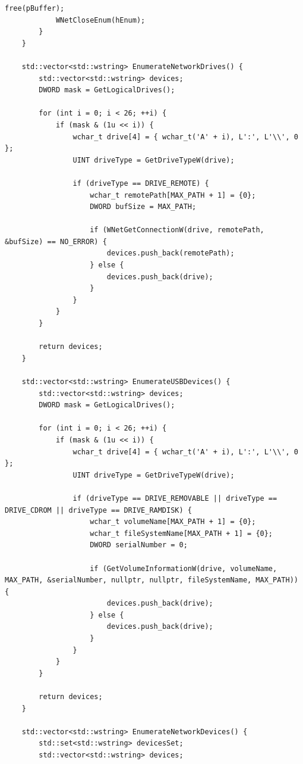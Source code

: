 \begin{lstlisting}[style=CodeListing]
            free(pBuffer);
            WNetCloseEnum(hEnum);
        }
    }
    
    std::vector<std::wstring> EnumerateNetworkDrives() {
        std::vector<std::wstring> devices;
        DWORD mask = GetLogicalDrives();
        
        for (int i = 0; i < 26; ++i) {
            if (mask & (1u << i)) {
                wchar_t drive[4] = { wchar_t('A' + i), L':', L'\\', 0 };
                UINT driveType = GetDriveTypeW(drive);
                
                if (driveType == DRIVE_REMOTE) {
                    wchar_t remotePath[MAX_PATH + 1] = {0};
                    DWORD bufSize = MAX_PATH;
                    
                    if (WNetGetConnectionW(drive, remotePath, &bufSize) == NO_ERROR) {
                        devices.push_back(remotePath);
                    } else {
                        devices.push_back(drive);
                    }
                }
            }
        }
        
        return devices;
    }
    
    std::vector<std::wstring> EnumerateUSBDevices() {
        std::vector<std::wstring> devices;
        DWORD mask = GetLogicalDrives();
        
        for (int i = 0; i < 26; ++i) {
            if (mask & (1u << i)) {
                wchar_t drive[4] = { wchar_t('A' + i), L':', L'\\', 0 };
                UINT driveType = GetDriveTypeW(drive);
                
                if (driveType == DRIVE_REMOVABLE || driveType == DRIVE_CDROM || driveType == DRIVE_RAMDISK) {
                    wchar_t volumeName[MAX_PATH + 1] = {0};
                    wchar_t fileSystemName[MAX_PATH + 1] = {0};
                    DWORD serialNumber = 0;
                    
                    if (GetVolumeInformationW(drive, volumeName, MAX_PATH, &serialNumber, nullptr, nullptr, fileSystemName, MAX_PATH)) {
                        devices.push_back(drive);
                    } else {
                        devices.push_back(drive);
                    }
                }
            }
        }
        
        return devices;
    }
    
    std::vector<std::wstring> EnumerateNetworkDevices() {
        std::set<std::wstring> devicesSet;
        std::vector<std::wstring> devices;
        

\end{lstlisting}
